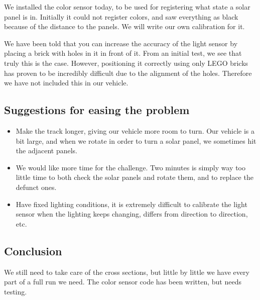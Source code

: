We installed the color sensor today, to be used for registering what state a solar
panel is in. Initially it could not register colors, and saw everything
as black because of the distance to the panels. We will write our own
calibration for it.

We have been told that you can increase the accuracy of the light sensor
by placing a brick with holes in it in front of it. From an initial
test, we see that truly this is the case. However, positioning it
correctly using only LEGO bricks has proven to be incredibly difficult due to
the alignment of the holes. Therefore we have not included this in our
vehicle.

\subsection{Suggestions for easing the problem}

\begin{itemize}
\itemsep1pt\parskip0pt
\item
  Make the track longer, giving our vehicle more room to turn. Our
  vehicle is a bit large, and when we rotate in order to turn a solar
  panel, we sometimes hit the adjacent panels.
\item
  We would like more time for the challenge. Two minutes is simply way too
  little time to both check the solar panels and rotate them, and to replace
  the defunct ones.
\item
  Have fixed lighting conditions, it is extremely difficult to
  calibrate the light sensor when the lighting keeps changing, differs
  from direction to direction, etc.
\end{itemize}

\subsection{Conclusion}

We still need to take care of the cross sections, but little by little
we have every part of a full run we need. The color sensor code has been
written, but needs testing.

